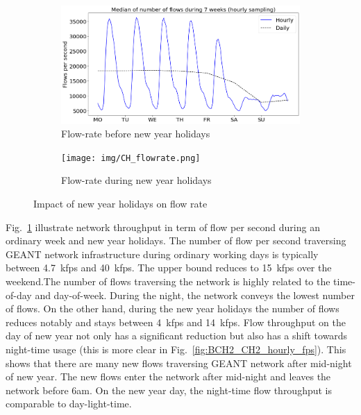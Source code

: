 \documentclass[10pt, journal, letterpaper]{IEEEtran}
\newcommand\linearFigSze{0.48}
\begin{document}
\begin{figure}
    \begin{subfigure}{\linearFigSze\textwidth}
          \centering
          \includegraphics[width=\columnwidth]{img/BCH_flowrate.png}
          \caption{Flow-rate before new year holidays}
          \label{fig:BCH_fps}
    \end{subfigure}
    \begin{subfigure}{\linearFigSze\textwidth}
          \centering
          \texttt{[image: img/CH\_flowrate.png]}
          \caption{Flow-rate during new year holidays}
          \label{fig:CH_fps}
    \end{subfigure}
    \caption{Impact of new year holidays on flow rate}
    \label{fig:flowrate_BCH_CH}
\end{figure}
Fig.~\ref{fig:BCH_fps} illustrate network throughput in term of flow per second during an ordinary week and new year holidays. The number of flow per second traversing GEANT network infrastructure during ordinary working days is typically between 4.7~kfps and 40~kfps. The upper bound reduces to 15~kfps over the weekend.The number of flows traversing the network is highly related to the time-of-day and day-of-week. During the night, the network conveys the lowest number of flows. 
On the other hand, during the new year holidays the number of flows reduces notably and stays between 4~kfps and 14~kfps. Flow throughput on the day of new year not only has a significant reduction but also has a shift towards night-time usage (this is more clear in Fig.~\ref{fig:BCH2_CH2_hourly_fps}). This shows that there are many new flows traversing GEANT network after mid-night of new year. The new flows enter the network after mid-night and leaves the network before 6am. On the new year day, the night-time flow throughput is comparable to day-light-time.
\end{document}
